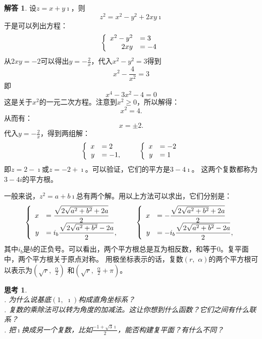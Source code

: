 \documentclass[12pt,UTF8]{ctexbook}
\theoremstyle{definition}
\newtheorem*{so}{解答}
\theoremstyle{plain}
\newtheorem{sk}{思考}[section]
\begin{document}
\begin{so}
    设$z = x + y\imath$，则
    $$ z^2 = x^2 - y^2 + 2xy\imath$$
    于是可以列出方程：
    $$
    \left\{
        \begin{array}[]{rl}
            x^2 - y^2 &= 3 \\
            2xy &= -4
        \end{array}
    \right.
    $$
    从$2xy = -2$可以得出$y = -\frac{2}{x}$，代入$x^2 - y^2 = 3$得到
    $$ x^2 - \frac{4}{x^2} = 3$$
    即
    $$ x^4 - 3x^2 - 4 = 0$$
    这是关于$x^2$的一元二次方程。注意到$x^2 \geqslant 0$，所以解得：
    $$ x^2 = 4. $$
    从而有：
    $$ x = \pm 2 . $$
    代入$y = -\frac{2}{x}$，得到两组解：
    $$
    \left\{
        \begin{array}[]{rl}
            x &= 2 \\
            y &= -1,
        \end{array}
    \right.
    \qquad
    \left\{
        \begin{array}[]{rl}
            x &= -2 \\
            y &= 1
        \end{array}
    \right.
    $$ 
    即$z = 2 - \imath$或$z = -2 + \imath$。可以验证，它们的平方是$3 - 4\imath$。
    这两个复数都称为$3 - 4i$的平方根。
\end{so}

一般来说，$z^2 = a + b\imath$总有两个解。用以上方法可以求出，它们分别是：
$$
\left\{
    \begin{array}[]{rl}
        x &=\displaystyle \frac{\sqrt{2\sqrt{a^2 + b^2} + 2a}}{2} \\
        y &=\displaystyle i_b \frac{\sqrt{2\sqrt{a^2 + b^2} - 2a}}{2},
    \end{array}
\right.
\qquad
\left\{
    \begin{array}[]{rl}
        x &=\displaystyle -\frac{\sqrt{2\sqrt{a^2 + b^2} + 2a}}{2} \\
        y &=\displaystyle -i_b \frac{\sqrt{2\sqrt{a^2 + b^2} - 2a}}{2},
    \end{array}
\right.
$$ 
其中$i_b$是$b$的正负号。可以看出，两个平方根总是互为相反数，和等于$0$。复平面中，两个平方根关于原点对称。
用极坐标表示的话，复数$(r,\,\,\alpha)$的两个平方根可以表示为$\displaystyle\left(\sqrt{r},\,\,\frac{\alpha}{2}\right)$
和$\displaystyle\left(\sqrt{r},\,\,\frac{\alpha}{2}+\pi\right)$。

\begin{sk}
    \mbox{} \\
    . 为什么说基底$(1,\,\,\imath)$构成直角坐标系？\\
    . 复数的乘除法可以转为角度的加减法。这让你想到什么函数？它们之间有什么联系？\\
    . 把$\imath$换成另一个复数，比如$\displaystyle \frac{-1+\sqrt{3}\imath}{2}$，能否构建复平面？有什么不同？
\end{sk}
\end{document}
